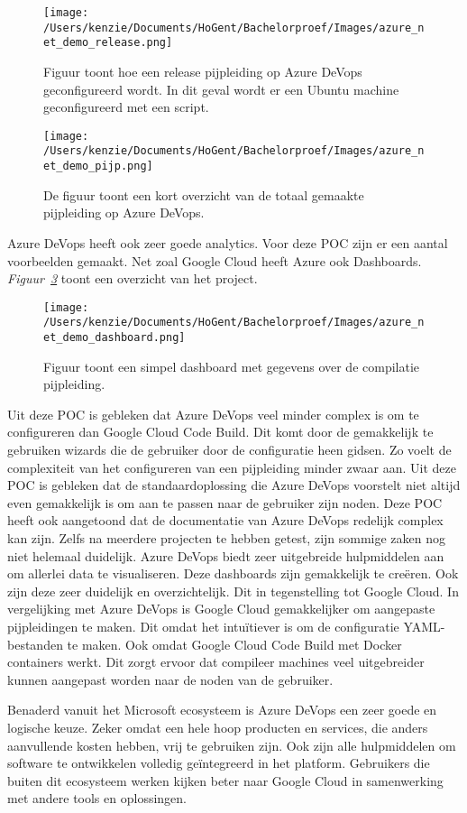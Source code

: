 \begin{figure}[!htbp]
    \centering
    \texttt{[image: /Users/kenzie/Documents/HoGent/Bachelorproef/Images/azure\_net\_demo\_release.png]}
    \caption{Figuur toont hoe een release pijpleiding op Azure DeVops geconfigureerd wordt. In dit geval wordt er een Ubuntu machine geconfigureerd met een script.}
    \label{fig:Azure_POC_release}
\end{figure}

\begin{figure}[!htbp]
    \centering
    \texttt{[image: /Users/kenzie/Documents/HoGent/Bachelorproef/Images/azure\_net\_demo\_pijp.png]}
    \caption{De figuur toont een kort overzicht van de totaal gemaakte pijpleiding op Azure DeVops.}
    \label{fig:Azure_POC_pijp}
\end{figure}

Azure DeVops heeft ook zeer goede analytics. Voor deze POC zijn er een aantal voorbeelden gemaakt. Net zoal Google Cloud heeft Azure ook Dashboards. \emph{Figuur~\ref{fig:Azure_POC_dashboard}} toont een overzicht van het project.

\begin{figure}[!htbp]
    \centering
    \texttt{[image: /Users/kenzie/Documents/HoGent/Bachelorproef/Images/azure\_net\_demo\_dashboard.png]}
    \caption{Figuur toont een simpel dashboard met gegevens over de compilatie pijpleiding.}
    \label{fig:Azure_POC_dashboard}
\end{figure}

Uit deze POC is gebleken dat Azure DeVops veel minder complex is om te configureren dan Google Cloud Code Build. Dit komt door de gemakkelijk te gebruiken wizards die de gebruiker door de configuratie heen gidsen. Zo voelt de complexiteit van het configureren van een pijpleiding minder zwaar aan. Uit deze POC is gebleken dat de standaardoplossing die Azure DeVops voorstelt niet altijd even gemakkelijk is om aan te passen naar de gebruiker zijn noden. Deze POC heeft ook aangetoond dat de documentatie van Azure DeVops redelijk complex kan zijn. Zelfs na meerdere projecten te hebben getest, zijn sommige zaken nog niet helemaal duidelijk. Azure DeVops biedt zeer uitgebreide hulpmiddelen aan om allerlei data te visualiseren. Deze dashboards zijn gemakkelijk te creëren. Ook zijn deze zeer duidelijk en overzichtelijk. Dit in tegenstelling tot Google Cloud. In vergelijking met Azure DeVops is Google Cloud gemakkelijker om aangepaste pijpleidingen te maken. Dit omdat het intuïtiever is om de configuratie YAML-bestanden te maken. Ook omdat Google Cloud Code Build met Docker containers werkt. Dit zorgt ervoor dat compileer machines veel uitgebreider kunnen aangepast worden naar de noden van de gebruiker.

Benaderd vanuit het Microsoft ecosysteem is Azure DeVops een zeer goede en logische keuze. Zeker omdat een hele hoop producten en services, die anders aanvullende kosten hebben, vrij te gebruiken zijn. Ook zijn alle hulpmiddelen om software te ontwikkelen volledig geïntegreerd in het platform. Gebruikers die buiten dit ecosysteem werken kijken beter naar Google Cloud in samenwerking met andere tools en oplossingen.


